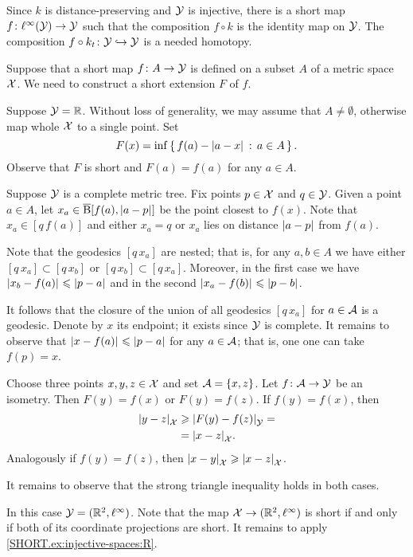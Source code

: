 Since $k$ is distance-preserving and $\mathcal{Y}$ is injective,
there is a short map $f\colon\ell^\infty(\mathcal{Y})\to \mathcal{Y}$ such that the composition $f\circ k$ is the identity map on $\mathcal{Y}$.
The composition $f\circ k_t\colon\mathcal{Y}\hookrightarrow \mathcal{Y}$ is a needed homotopy. 

Suppose that a short map $f\colon A\to\mathcal{Y}$ is defined on a subset $A$ of a metric space $\mathcal{X}$.
We need to construct a short extension $F$ of $f$.

Suppose $\mathcal{Y}=\mathbb{R}$.
Without loss of generality, we may assume that $A\ne\emptyset$, otherwise map whole $\mathcal{X}$ to a single point.
Set 
\[F(x)=\inf\set{f(a)-\dist{a}{x}{}}{a\in A}.\] 
Observe that $F$ is short and $F(a)=f(a)$ for any $a\in A$.

Suppose  $\mathcal{Y}$ is a complete metric tree.
Fix points $p\in \mathcal{X}$ and $q\in\mathcal{Y}$.
Given a point $a\in A$,
let $x_a\in\cBall[f(a),\dist{a}{p}{}]$ be the point closest to $f(x)$.
Note that $x_a\in[q\,f(a)]$ and either $x_a=q$ or $x_a$ lies on distance $\dist{a}{p}{}$ from $f(a)$.

Note that the geodesics $[q\,x_a]$ are nested;
that is, for any $a,b\in A$ we have either $[q\,x_a]\subset [q\,x_b]$ or $[q\,x_b]\subset [q\,x_a]$.
Moreover, in the first case we have $\dist{x_b}{f(a)}{}\le \dist{p}{a}{}$ and in the second $\dist{x_a}{f(b)}{}\le \dist{p}{b}{}$.

It follows that the closure of the union of all geodesics $[q\,x_a]$ for $a\in\mathcal{A}$ is a geodesic.
Denote by $x$ its endpoint; it exists since $\mathcal{Y}$ is complete.
It remains to observe that $\dist{x}{f(a)}{}\le \dist{p}{a}{}$ for any $a\in\mathcal{A}$;
that is, one one can take $f(p)=x$.

Choose three points $x,y,z\in\mathcal{X}$ and set $\mathcal{A}=\{x,z\}$.
Let $f\colon\mathcal{A}\to \mathcal{Y}$ be an isometry.
Then $F(y)=f(x)$ or $F(y)=f(z)$.
If  $f(y)=f(x)$, then
\begin{align*}
\dist{y}{z}{\spc{X}}&\ge  \dist{F(y)}{f(z)}{\spc{Y}}=
\\
 &=\dist{x}{z}{\spc{X}}.
\end{align*}
Analogously if $f(y)=f(z)$, then $\dist{x}{y}{\spc{X}}\ge\dist{x}{z}{\spc{X}}$.

It remains to observe that the strong triangle inequality holds in both cases.

In this case $\mathcal{Y}=(\mathbb{R}^2,\ell^\infty)$.
Note that the map $\mathcal{X}\to (\mathbb{R}^2,\ell^\infty)$ is short if and only if both of its coordinate projections are short.
It remains to apply \ref{SHORT.ex:injective-spaces:R}.

